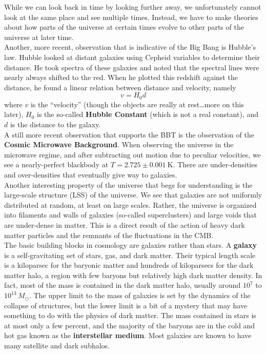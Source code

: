 \documentclass[10pt]{article}
\numberwithin{equation}{section}
\newcommand{\n}{\noindent}
\begin{document}
	\n While we can look back in time by looking further away, we unfortunately cannot look at the same place and see multiple times. Instead, we have to make theories about how parts of the universe at certain times evolve to other parts of the universe at later time.\\
	
	\n Another, more recent, observation that is indicative of the Big Bang is Hubble's law. Hubble looked at distant galaxies using Cepheid variables to determine their distance. He took spectra of these galaxies and noted that the spectral lines were nearly always shifted to the red. When he plotted this redshift against the distance, he found a linear relation between distance and velocity, namely
	\begin{equation}
		\label{eq:1} v = H_0 d
	\end{equation}
	where $v$ is the ``velocity'' (though the objects are really at rest\ldots more on this later), $H_0$ is the so-called \textbf{Hubble Constant} (which is not a real constant), and $d$ is the distance to the galaxy.\\
	
	\n A still more recent observation that supports the BBT is the observation of the \textbf{Cosmic Microwave Background}. When observing the universe in the microwave regime, and after subtracting out motion due to peculiar velocities, we see a nearly-perfect blackbody at $T=2.725\pm 0.001\ \mathrm{K}$. There are under-densities and over-densities that eventually give way to galaxies.\\
	
	\n Another interesting property of the universe that begs for understanding is the large-scale structure (LSS) of the universe. We see that galaxies are not uniformly distributed at random, at least on large scales. Rather, the universe is organized into filaments and walls of galaxies (so-called superclusters) and large voids that are under-dense in matter. This is a direct result of the action of heavy dark matter particles and the remnants of the fluctuations in the CMB.\\
	
	\n The basic building blocks in cosmology are galaxies rather than stars. A \textbf{galaxy} is a self-gravitating set of stars, gas, and dark matter. Their typical length scale is a kiloparsec for the baryonic matter and hundreds of kiloparsecs for the dark matter halo, a region with few baryons but relatively high dark matter density. In fact, most of the mass is contained in the dark matter halo, usually around $10^{7}$ to $10^{13}\,M_\odot$. The upper limit to the mass of galaxies is set by the dynamics of the collapse of structures, but the lower limit is a bit of a mystery that may have something to do with the physics of dark matter. The mass contained in stars is at most only a few percent, and the majority of the baryons are in the cold and hot gas known as the \textbf{interstellar medium}. Most galaxies are known to have many satellite and dark subhalos. \\
	
\end{document}
